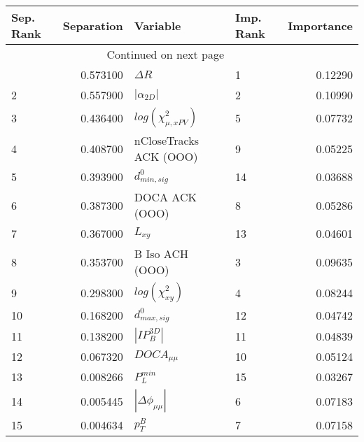 \usepackage{lscape}

\begin{landscape}
\begin{longtable}{lrllr}
\toprule
Sep. Rank &  Separation &                   Variable & Imp. Rank &  Importance \\
\midrule
\endhead
\midrule
\multicolumn{3}{r}{{Continued on next page}} \\
\midrule
\endfoot

\bottomrule
\endlastfoot
        1 &    0.573100 &                 $\Delta R$ &         1 &     0.12290 \\
        2 &    0.557900 &            $|\alpha_{2D}|$ &         2 &     0.10990 \\
        3 &    0.436400 &  $log(\chi^{2}_{\mu,xPV})$ &         5 &     0.07732 \\
        4 &    0.408700 &     nCloseTracks ACK (OOO) &         9 &     0.05225 \\
        5 &    0.393900 &           $d^0_{min, sig}$ &        14 &     0.03688 \\
        6 &    0.387300 &             DOCA ACK (OOO) &         8 &     0.05286 \\
        7 &    0.367000 &                   $L_{xy}$ &        13 &     0.04601 \\
        8 &    0.353700 &            B Iso ACH (OOO) &         3 &     0.09635 \\
        9 &    0.298300 &       $log(\chi^{2}_{xy})$ &         4 &     0.08244 \\
       10 &    0.168200 &           $d^0_{max, sig}$ &        12 &     0.04742 \\
       11 &    0.138200 &            $|IP_{B}^{3D}|$ &        11 &     0.04839 \\
       12 &    0.067320 &            $DOCA_{\mu\mu}$ &        10 &     0.05124 \\
       13 &    0.008266 &              $P^{min}_{L}$ &        15 &     0.03267 \\
       14 &    0.005445 &   $|\Delta \phi_{\mu\mu}|$ &         6 &     0.07183 \\
       15 &    0.004634 &                  $p^B_{T}$ &         7 &     0.07158 \\
\end{longtable}

\end{landscape}
